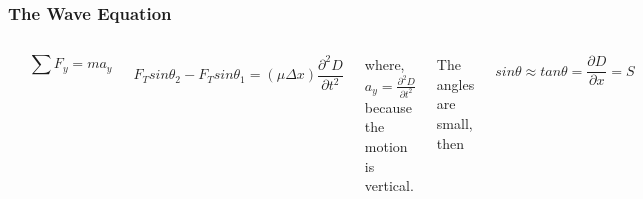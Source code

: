 \documentclass[]{beamer}
\begin{document}
\begin{frame}
\frametitle{The Wave Equation}



   \begin{columns}[c]
   \column{2in}  %
   \begin{center}
  \includegraphics[height=1.in]{images4/10.jpg}
\end{center}




\begin{equation*}
\sum F_y=ma_y
\end{equation*}

\pause

   \column{2.5in}

\begin{equation*}
F_Tsin\theta_2-F_Tsin\theta_1=(\mu\Delta x)\frac{\partial^2 D}{\partial t^2}
\end{equation*}

\pause

where, $a_y=\frac{\partial^2 D}{\partial t^2}$ because the motion is vertical.


\pause

The angles are small, then

\pause

\begin{equation*}
sin\theta\approx tan\theta=\frac{\partial D}{\partial x}=S
\end{equation*}

\pause




   \end{columns}









  \end{frame}







\end{document}
